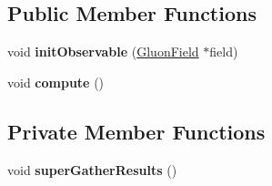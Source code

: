\subsection*{Public Member Functions}
\begin{DoxyCompactItemize}
\item 
void {\bfseries init\+Observable} (\hyperlink{classField}{Gluon\+Field} $\ast$field)\hypertarget{classSuperObs_a292660868f04e6afc8c1300ec6fca5cc}{}\label{classSuperObs_a292660868f04e6afc8c1300ec6fca5cc}

\item 
void {\bfseries compute} ()\hypertarget{classSuperObs_a84e5e240fca5bdab31046fa87805456d}{}\label{classSuperObs_a84e5e240fca5bdab31046fa87805456d}

\end{DoxyCompactItemize}
\subsection*{Private Member Functions}
\begin{DoxyCompactItemize}
\item 
void {\bfseries super\+Gather\+Results} ()\hypertarget{classSuperObs_a24f0e5e87655af0c44d041fc332db1e7}{}\label{classSuperObs_a24f0e5e87655af0c44d041fc332db1e7}

\end{DoxyCompactItemize}
